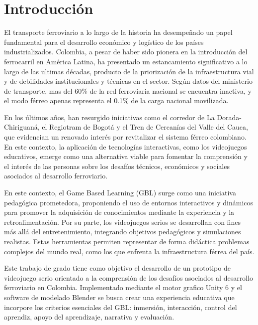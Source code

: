 
\chapter{Introducción}

El transporte ferroviario a lo largo de la historia ha desempeñado un papel fundamental para el desarrollo económico y logístico de los países industrializados. Colombia, a pesar de haber sido pionera en la introducción del ferrocarril en América Latina, ha presentado un estancamiento significativo a lo largo de las ultimas décadas, producto de la priorización de la infraestructura vial y de debilidades institucionales y técnicas en el sector. Según datos del ministerio de transporte, mas del 60\% de la red ferroviaria nacional se encuentra inactiva, y el modo férreo apenas representa el 0.1\% de la carga nacional movilizada.

En los últimos años, han resurgido iniciativas como el corredor de La Dorada-Chiriguaná, el Regiotram de Bogotá y el Tren de Cercanías del Valle del Cauca, que evidencian un renovado interés por revitalizar el sistema férreo colombiano. En este contexto, la aplicación de tecnologías interactivas, como los videojuegos educativos, emerge como una alternativa viable para fomentar la comprensión y el interés de las personas sobre los desafíos técnicos, económicos y sociales asociados al desarrollo ferroviario.

En este contexto, el Game Based Learning (GBL) surge como una iniciativa pedagógica prometedora, proponiendo el uso de entornos interactivos y dinámicos para promover la adquisición de conocimientos mediante la experiencia y la retroalimentación. Por su parte, los videojuegos serios se desarrollan con fines más allá del entretenimiento, integrando objetivos pedagógicos y simulaciones realistas. Estas herramientas permiten representar de forma didáctica problemas complejos del mundo real, como los que enfrenta la infraestructura férrea del país.

Este trabajo de grado tiene como objetivo el desarrollo de un prototipo de videojuego serio orientado a la comprensión de los desafíos asociados al desarrollo ferroviario en Colombia. Implementado mediante el motor grafico Unity 6 y el software de modelado Blender se busca crear una experiencia educativa que incorpore los criterios esenciales del GBL: inmersión, interacción, control del aprendiz, apoyo del aprendizaje, narrativa y evaluación.


